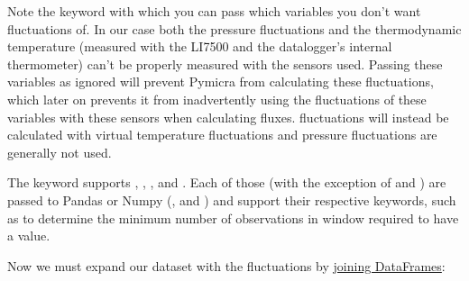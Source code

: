 \documentclass[a4paper,10pt,oneside]{sphinxmanual}
\begin{document}
Note the  keyword with which you can pass which variables you don't
want fluctuations of. In our case both the pressure fluctuations and the
thermodynamic temperature (measured with the LI7500 and the datalogger's
internal thermometer) can't be properly measured with the sensors used. Passing
these variables as ignored will prevent Pymicra from calculating these
fluctuations, which later on prevents it from inadvertently using the
fluctuations of these variables with these sensors when calculating fluxes.
 fluctuations will instead be calculated with virtual temperature
fluctuations and pressure fluctuations are generally not used.

The  keyword supports , ,
,  and .  Each of those (with the
exception of  and ) are passed to Pandas or Numpy
(,  and ) and
support their respective keywords, such as  to determine the minimum
number of observations in window required to have a value.

Now we must expand our dataset with the fluctuations by \href{http://pandas.pydata.org/pandas-docs/stable/generated/pandas.DataFrame.join.html}{joining DataFrames}:
\end{document}
